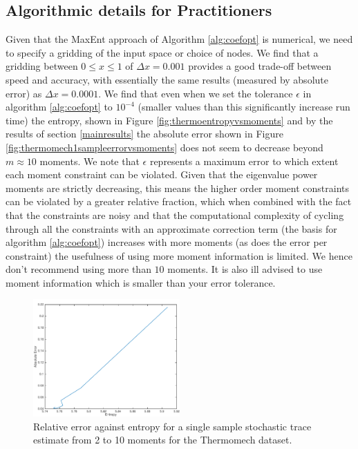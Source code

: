 \documentclass[journal]{IEEEtran}
\begin{document}
	\subsection{Algorithmic details for Practitioners}
	Given that the MaxEnt approach of Algorithm \ref{alg:coefopt} is numerical, we need to specify a gridding of the input space or choice of nodes. We find that a gridding between $0\leq x \leq 1$ of $\Delta x = 0.001$ provides a good trade-off between speed and accuracy, with essentially the same results (measured by absolute error) as $\Delta x = 0.0001$. We find that even when we set the tolerance $\epsilon$ in algorithm \ref{alg:coefopt} to $10^{-4}$ (smaller values than this significantly increase run time) the entropy, shown in Figure \ref{fig:thermoentropyvsmoments} and by the results of section \ref{mainresults}  the absolute error shown in Figure \ref{fig:thermomech1sampleerrorvsmoments} does not seem to decrease beyond $m \approx 10$ moments. We note that $\epsilon$ represents a maximum error to which extent each moment constraint can be violated. Given that the eigenvalue power moments are strictly decreasing, this means the higher order moment constraints can be violated by a greater relative fraction, which when combined with the fact that the constraints are noisy and that the computational complexity of cycling through all the constraints with an approximate correction term (the basis for algorithm \ref{alg:coefopt}) increases with more moments (as does the error per constraint) the usefulness of using more moment information is limited. We hence don't recommend using more than $10$ moments. It is also ill advised to use moment information which is smaller than your error tolerance.
	\begin{figure}[t]
		\centering 
		\includegraphics[width=0.5\textwidth]{thermoentr1smp-cropped}
		\caption{Relative error against entropy for a single sample stochastic trace estimate from 2 to 10 moments for the Thermomech dataset.}
		\label{fig:thermomech1sampleerrorvsentropy}
	\end{figure}
\end{document}
